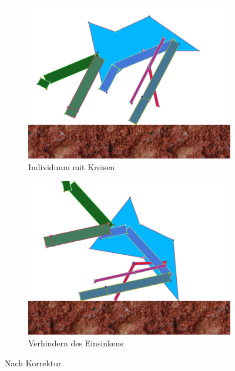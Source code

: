       \begin{figure}[H]
        \centering
        \begin{subfigure}[b]{0.45\textwidth}
          \includegraphics[width=\linewidth,center]{graphics/physics-engine/sink-fix-0}
          \caption{Individuum mit Kreisen\label{fig:noVorEinsinken}}
        \end{subfigure}
        \qquad
        \begin{subfigure}[b]{0.45\textwidth}
          \includegraphics[width=\linewidth,center]{graphics/physics-engine/sink-fix-1}
          \caption{Verhindern des Einsinkens\label{fig:noNachEinsinken}}
        \end{subfigure}
        \caption{Nach Korrektur}
      \end{figure}

